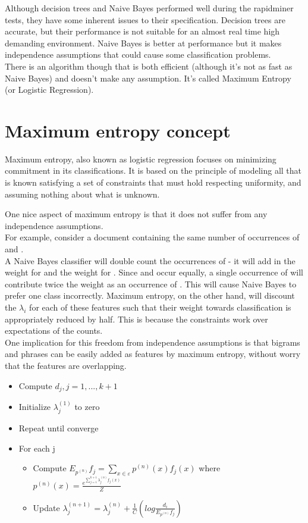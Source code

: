 Although decision trees and Naive Bayes performed well during the rapidminer tests, they have some inherent issues to their specification. Decision trees are accurate, but their performance is 
not suitable for an almost real time high demanding environment. Naive Bayes is better at performance but it makes independence assumptions that could cause some classification problems.\\
There is an algorithm though that is both efficient (although it's not as fast as Naive Bayes) and doesn't make any assumption. It's called Maximum Entropy (or Logistic Regression).

\section{Maximum entropy concept}
Maximum entropy, also known as logistic regression focuses on minimizing commitment in its classifications. It is based on the principle of modeling all that is known satisfying a set of constraints
that must hold respecting uniformity, and assuming nothing about what is unknown.

One nice aspect of maximum entropy is that it does not suffer from any independence assumptions.\\
For example, consider a document containing the same number of occurrences of  and .\\
A Naive Bayes classifier will double count the occurrences of  
- it will add in the weight for  and the weight for . Since  and
 occur equally, a single occurrence of  will contribute twice the weight as an occurrence of . This will cause Naive Bayes to prefer one class 
incorrectly.
Maximum entropy, on the other hand, will discount the $\lambda_i$ for each of these features such that their weight towards classification is appropriately reduced by half.
This is because the constraints work over expectations of the counts. \\
One implication for this freedom from independence assumptions is that bigrams and phrases can be easily added as features by maximum entropy, without worry that the features are overlapping.


\begin{itemize}
\item Compute $d_j, j=1,...,k+1$
\item Initialize $\lambda_j^{(1)}$ to zero
\item Repeat until converge
\item For each j 
  \begin{itemize}
  \item Compute $E_{p^{(n)}} f_j = \sum\limits_{x \in \varepsilon} p^{(n)} (x)f_j(x)$
    where $p^{(n)}(x) = \frac{e^{\sum\limits_{j=1}^{k+1}\lambda_j^{(n)}f_j(x)}}{Z}$ 
  \item Update $\lambda_j^{(n+1)} = \lambda_j^{(n)} + \frac{1}{C}(log\frac{d_i}{E_{{p^{(n)}}}f_j})$
  \end{itemize}
\end{itemize}

